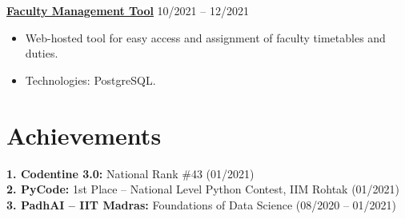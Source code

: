 \documentclass[a4paper,11pt]{article}
\begin{document}
\noindent\textbf{\href{https://github.com/Abhijit-Sethi/Test_DBMS}{Faculty Management Tool}} \hfill 10/2021 -- 12/2021
\begin{itemize}[noitemsep,topsep=0pt,parsep=0pt,partopsep=0pt]
    \item Web-hosted tool for easy access and assignment of faculty timetables and duties.
    \item Technologies: PostgreSQL.
\end{itemize}

\section*{Achievements}
\noindent
\textbf{1. Codentine 3.0:} National Rank \#43 (01/2021) \\
\textbf{2. PyCode:} 1st Place -- National Level Python Contest, IIM Rohtak (01/2021) \\
\textbf{3. PadhAI -- IIT Madras:} Foundations of Data Science (08/2020 -- 01/2021)
\end{document}

